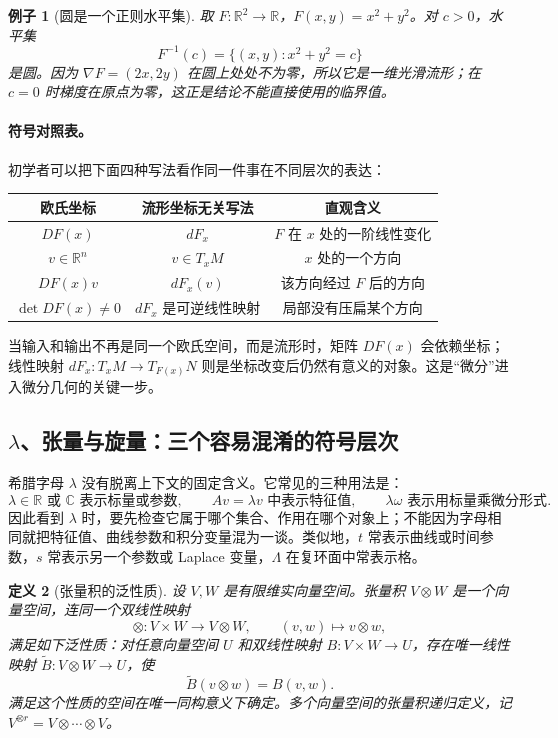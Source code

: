 \documentclass[UTF8,fontset=none,a4paper,11pt]{ctexart}
\theoremstyle{foundation-definition}
\newtheorem{definition}{定义}[section]
\theoremstyle{foundation-theorem}
\theoremstyle{foundation-proposition}
\theoremstyle{foundation-example}
\newtheorem{example}[definition]{例子}
\theoremstyle{foundation-remark}
\theoremstyle{foundation-theorem}
\begin{document}
\begin{example}[圆是一个正则水平集]
取 \(F:\mathbb R^2\to\mathbb R\)，\(F(x,y)=x^2+y^2\)。对 \(c>0\)，水平集
\[
F^{-1}(c)=\{(x,y):x^2+y^2=c\}
\]
是圆。因为 \(\nabla F=(2x,2y)\) 在圆上处处不为零，所以它是一维光滑流形；在 \(c=0\) 时梯度在原点为零，这正是结论不能直接使用的临界值。
\end{example}

\paragraph{符号对照表。}
初学者可以把下面四种写法看作同一件事在不同层次的表达：
\begin{center}
\begin{tabular}{c|c|c}
欧氏坐标 & 流形坐标无关写法 & 直观含义 \\
\hline
\(DF(x)\) & \(dF_x\) & \(F\) 在 \(x\) 处的一阶线性变化 \\
\(v\in\mathbb R^n\) & \(v\in T_xM\) & \(x\) 处的一个方向 \\
\(DF(x)v\) & \(dF_x(v)\) & 该方向经过 \(F\) 后的方向 \\
\(\det DF(x)\neq0\) & \(dF_x\) 是可逆线性映射 & 局部没有压扁某个方向
\end{tabular}
\end{center}
当输入和输出不再是同一个欧氏空间，而是流形时，矩阵 \(DF(x)\) 会依赖坐标；线性映射 \(dF_x:T_xM\to T_{F(x)}N\) 则是坐标改变后仍然有意义的对象。这是“微分”进入微分几何的关键一步。

\subsection{\texorpdfstring{\(\lambda\)、张量与旋量：三个容易混淆的符号层次}{lambda、张量与旋量：三个容易混淆的符号层次}}

希腊字母 \(\lambda\) 没有脱离上下文的固定含义。它常见的三种用法是：
\[
\lambda\in\mathbb R\text{ 或 }\mathbb C\text{ 表示标量或参数},\qquad
Av=\lambda v\text{ 中表示特征值},\qquad
\lambda\omega\text{ 表示用标量乘微分形式}.
\]
因此看到 \(\lambda\) 时，要先检查它属于哪个集合、作用在哪个对象上；不能因为字母相同就把特征值、曲线参数和积分变量混为一谈。类似地，\(t\) 常表示曲线或时间参数，\(s\) 常表示另一个参数或 Laplace 变量，\(\Lambda\) 在复环面中常表示格。

\begin{definition}[张量积的泛性质]\label{def:tensor-product}
设 \(V,W\) 是有限维实向量空间。张量积 \(V\otimes W\) 是一个向量空间，连同一个双线性映射
\[
\otimes:V\times W\longrightarrow V\otimes W,\qquad(v,w)\longmapsto v\otimes w,
\]
满足如下泛性质：对任意向量空间 \(U\) 和双线性映射 \(B:V\times W\to U\)，存在唯一线性映射
\(\widetilde B:V\otimes W\to U\)，使
\[
\widetilde B(v\otimes w)=B(v,w).
\]
满足这个性质的空间在唯一同构意义下确定。多个向量空间的张量积递归定义，记
\(V^{\otimes r}=V\otimes\cdots\otimes V\)。
\end{definition}
\end{document}
